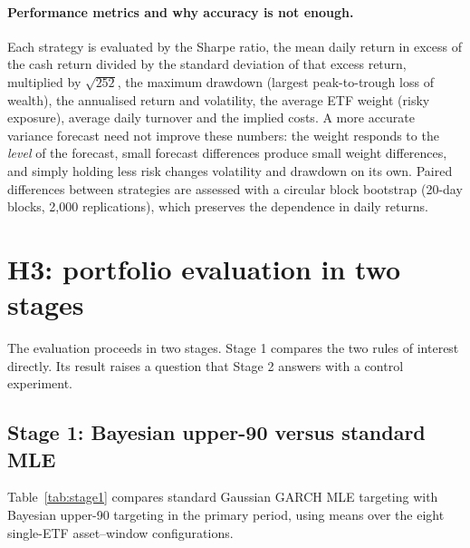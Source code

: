 \documentclass[11pt]{article}
\begin{document}
\paragraph{Performance metrics and why accuracy is not enough.} Each strategy is evaluated by the Sharpe ratio, the mean daily return in excess of the cash return divided by the
standard deviation of that excess return, multiplied by $\sqrt{252}$, the maximum drawdown (largest peak-to-trough loss of
wealth), the annualised return and volatility, the average ETF weight (risky exposure), average daily turnover and the
implied costs. A more accurate variance forecast need not improve these numbers: the weight responds to the
\emph{level} of the forecast, small forecast differences produce small weight differences, and simply holding less
risk changes volatility and drawdown on its own. Paired differences between strategies are assessed with a circular
block bootstrap \cite{politis1992} (20-day blocks, 2{,}000 replications), which preserves the dependence in daily returns.

\section{H3: portfolio evaluation in two stages}\label{sec:h3control}
The evaluation proceeds in two stages. Stage 1 compares the two rules of interest directly. Its result raises a
question that Stage 2 answers with a control experiment.

\subsection{Stage 1: Bayesian upper-90 versus standard MLE}\label{sec:stage1}
Table~\ref{tab:stage1} compares standard Gaussian GARCH MLE targeting with Bayesian upper-90 targeting in the primary
period, using means over the eight single-ETF asset--window configurations.

\begin{table}[h]\centering\small
\resizebox{.9\textwidth}{!}{}
\caption{Stage 1, 2017--22: standard MLE versus Bayesian upper-90, means over the 8 single-ETF configurations, 5 bp
costs. The last row counts configurations whose paired 95\% circular block-bootstrap interval for the difference
excludes zero.}\label{tab:stage1}
\end{table}
\end{document}
